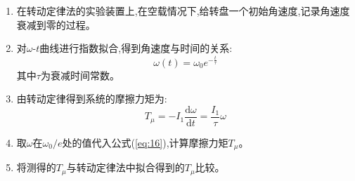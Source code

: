 \documentclass[UTF8]{ctexart}
\begin{document}
    \begin{enumerate}
    \item 在转动定律法的实验装置上,在空载情况下,给转盘一个初始角速度,记录角速度衰减到零的过程。
    \item 对$\omega$-$t$曲线进行指数拟合,得到角速度与时间的关系:
    \begin{equation}
    \omega(t)=\omega_0e^{-\frac{t}{\tau}} \label{eq:15}
    \end{equation}
    其中$\tau$为衰减时间常数。
    \item 由转动定律得到系统的摩擦力矩为:
    \begin{equation}
    T_\mu=-I_1\frac{\mathrm{d}\omega}{\mathrm{d}t}=\frac{I_1}{\tau}\omega \label{eq:16}
    \end{equation}
    \item 取$\omega$在$\omega_0/e$处的值代入公式(\ref{eq:16}),计算摩擦力矩$T_\mu$。
    \item 将测得的$T_\mu$与转动定律法中拟合得到的$T_\mu$比较。
    \end{enumerate}
    

\newpage
\end{document}
